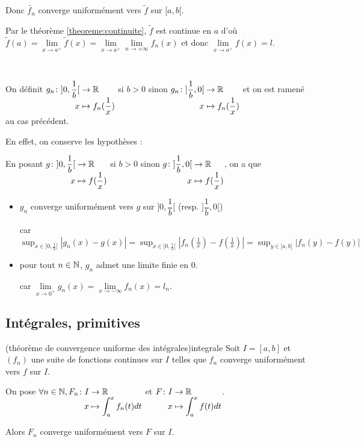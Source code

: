 \documentclass[a4paper,12pt]{article}
\begin{document}
\begin{demonstration}
\begin{description}
        Donc $\tilde{f_n}$ converge uniformément vers $\tilde{f}$ sur $[a, b[$.
        
        Par le théorème \ref{theoreme:continuite}, $\tilde{f}$ est continue en $a$
        d'où $\tilde{f}(a) = \lim\limits_{x \to a^+} \tilde{f}(x) = \lim\limits_{x \to a^+} \lim\limits_{n \to +\infty} f_n(x)$ et donc $\lim\limits_{x \to a^+} f(x) = l$.

        \item[Le cas de $a = -\infty$]~\par
        On définit $\funcdef{g_n}{] 0, \dfrac{1}{b}[}{\R}{x}{f_n(\dfrac{1}{x})}$ si $b > 0$
        sinon $\funcdef{g_n}{]\dfrac{1}{b}, 0[}{\R}{x}{f_n(\dfrac{1}{x})}$ et on est ramené au cas précédent.

        En effet, on conserve les hypothèses :
        
        En posant $\funcdef{g}{] 0, \dfrac{1}{b}[}{\R}{x}{f(\dfrac{1}{x})}$ si $b > 0$
        sinon $\funcdef{g}{]\dfrac{1}{b}, 0[}{\R}{x}{f(\dfrac{1}{x})}$, on a que
        \begin{itemize}[label=--]
            \item $g_n$ converge uniformément vers $g$ sur $]0, \dfrac{1}{b}[$ (resp. $]\dfrac{1}{b}, 0[$)
            
            car $\sup_{x \in ]0, \frac{1}{b}[} |g_n(x) - g(x)| = \sup_{x \in ]0, \frac{1}{b}[} |f_n(\frac{1}{x}) - f(\frac{1}{x})| = \sup_{y \in ]a, b[} |f_n(y) - f(y)|$
            \item pour tout $n \in \mathbb{N}$, $g_n$ admet une limite finie en $0$.
            
            car $\lim\limits_{x \to 0^+} g_n(x) = \lim\limits_{x \to -\infty} f_n(x) = l_n$.
        \end{itemize}
    \end{description}
\end{demonstration}

\subsection{Intégrales, primitives}

\begin{theoreme}{(théorème de convergence uniforme des intégrales)}{integrale}
    Soit $I = [a, b]$ et $(f_n)$ une suite de fonctions continues sur $I$ telles que $f_n$ converge uniformément vers $f$ sur $I$.

    On pose $\forall n \in \N, \funcdef{F_n}{I}{\R}{x}{\int_a^x f_n(t) dt}$ et $\funcdef{F}{I}{\R}{x}{\int_a^x f(t) dt}$.

    Alors $F_n$ converge uniformément vers $F$ sur $I$.
\end{theoreme}
\end{document}
